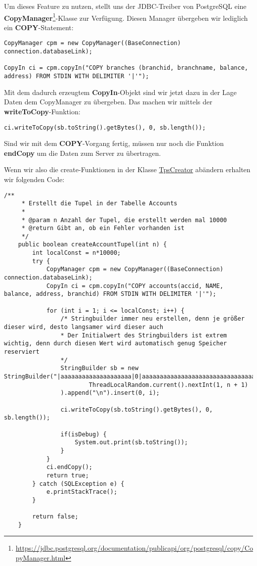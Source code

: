 Um dieses Feature zu nutzen, stellt uns der JDBC-Treiber von PostgreSQL eine
\textbf{CopyManager}\footnote{\url{https://jdbc.postgresql.org/documentation/publicapi/org/postgresql/copy/CopyManager.html}}-Klasse
zur Verfügung. Diesen Manager übergeben wir lediglich ein
\textbf{COPY}-Statement:

\begin{lstlisting}[caption={Initialisierung des CopyManagers},numbers=none]
CopyManager cpm = new CopyManager((BaseConnection) connection.databaseLink);

CopyIn ci = cpm.copyIn("COPY branches (branchid, branchname, balance, address) FROM STDIN WITH DELIMITER '|'");
\end{lstlisting}

Mit dem dadurch erzeugtem \textbf{CopyIn}-Objekt sind wir jetzt dazu in der Lage
Daten dem CopyManager zu übergeben. Das machen wir mittels der
\textbf{writeToCopy}-Funktion:

\begin{lstlisting}[caption={WriteToCopy-Funktion},numbers=none]
ci.writeToCopy(sb.toString().getBytes(), 0, sb.length());
\end{lstlisting}

Sind wir mit dem \textbf{COPY}-Vorgang fertig, müssen nur noch die Funktion
\textbf{endCopy} um die Daten zum Server zu übertragen.

Wenn wir also die create-Funktionen in der Klasse
\hyperref[lst:tpsv2]{TpsCreator} abändern erhalten wir folgenden Code:

\begin{lstlisting}[caption={createAccountTupel mit CopyManager}]
	/**
	 * Erstellt die Tupel in der Tabelle Accounts
	 * 
	 * @param n Anzahl der Tupel, die erstellt werden mal 10000
	 * @return Gibt an, ob ein Fehler vorhanden ist
	 */
	public boolean createAccountTupel(int n) {
		int localConst = n*10000;
		try {
			CopyManager cpm = new CopyManager((BaseConnection) connection.databaseLink);
			CopyIn ci = cpm.copyIn("COPY accounts(accid, NAME, balance, address, branchid) FROM STDIN WITH DELIMITER '|'");
			
			for (int i = 1; i <= localConst; i++) {
				/* Stringbuilder immer neu erstellen, denn je größer dieser wird, desto langsamer wird dieser auch
				* Der Initialwert des Stringbuilders ist extrem wichtig, denn durch diesen Wert wird automatisch genug Speicher reserviert
				*/
				StringBuilder sb = new StringBuilder("|aaaaaaaaaaaaaaaaaaaa|0|aaaaaaaaaaaaaaaaaaaaaaaaaaaaaaaaaaaaaaaaaaaaaaaaaaaaaaaaaaaaaaaaaaaa|").append(
						ThreadLocalRandom.current().nextInt(1, n + 1)
				).append("\n").insert(0, i);
				
				ci.writeToCopy(sb.toString().getBytes(), 0, sb.length());
				
				if(isDebug) {
					System.out.print(sb.toString());
				}
			}
	        ci.endCopy();			
			return true;
		} catch (SQLException e) {
			e.printStackTrace();
		}
		
		return false;
	}
\end{lstlisting}

